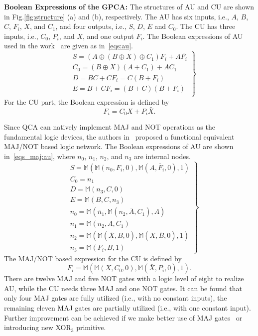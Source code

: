 \documentclass[9pt,journal,compsoc]{IEEEtran}
\begin{document}
\textbf{Boolean Expressions of the GPCA:}
The structures of AU and CU are shown in Fig.\ref{fig:structure} (a) and (b), respectively.
The AU has six inputs, i.e., $A$, $B$, $C$, $F_{i}$, $X$, and $C_{1}$, and four outputs, i.e., $S$, $D$, $E$ and $C_{0}$.
The CU has three inputs, i.e., $C_{0}$, $P_{i}$, and $X$, and one output $F_{i}$.
The Boolean expressions of AU used in the work~\cite{4} are given as in~\eqref{eqs:au}.
\begin{equation}~\label{eqs:au}
\left.
\begin{split}
& S =(A \oplus (B \oplus X) \oplus C_{1}) F_{i} + A\overline{F_{i}} \\
&C_{0} = (B \oplus X)(A + C_{1}) + AC_{1} \\
&D =BC + CF_{i} = C (B + F_{i})\\    
&E =  B + CF_{i} = (B+C)(B+F_{i})\\
\end{split}\right\}
\end{equation}
For the CU part, the Boolean expression is defined by
\begin{equation}\label{eq:cu}
F_{i} = C_{0}X + P_{i}\bar{X}.
\end{equation}

Since QCA can natively implement MAJ and NOT operations as the fundamental logic devices, the authors in~\cite{2} proposed a functional equivalent MAJ/NOT based logic network. The Boolean expressions of AU are shown in~\eqref{eqs_maj:au}, where $n_0$, $n_1$, $n_2$, and $n_3$ are internal nodes.
\begin{equation}~\label{eqs_maj:au}
\left.
\begin{split}
& S = \mathbb{M}(\mathbb{M}(n_0, F_i, 0),\mathbb{M}(A, \bar F_i, 0 ), 1) \\
&C_{0} = n_1 \\
&D = \mathbb{M}(n_3, C, 0)\\    
&E = \mathbb{M}(B, C, n_3)\\
& n_0 = \mathbb{M}( \bar n_1, \mathbb{M}(n_2, \bar A, C_1), A )\\
& n_1 = \mathbb{M}(n_2, A, C_1) \\
& n_2 = \mathbb{M}(\mathbb{M}(\bar X, B, 0), \mathbb{M}(X, \bar B, 0 ), 1) \\
& n_3 = \mathbb{M}(F_i, B, 1)
\end{split}
\right\}
\end{equation}
The MAJ/NOT based expression for the CU is defined by
\begin{equation}\label{eq:cu}
F_{i} = \mathbb{M}(\mathbb{M}(X, C_0, 0), \mathbb{M}(\bar X, P_i, 0 ), 1).
\end{equation}
There are twelve MAJ and five NOT gates with a logic level of eight to realize AU, while the CU needs three MAJ and one NOT gates.
It can be found that only four MAJ gates are fully utilized (i.e., with no constant inputs), the remaining eleven MAJ gates are partially utilized (i.e., with one constant input). Further improvement can be achieved if we make better use of MAJ gates~\cite{Abedi2018Decimal} or introducing new XOR$_3$ primitive. 
\end{document}
